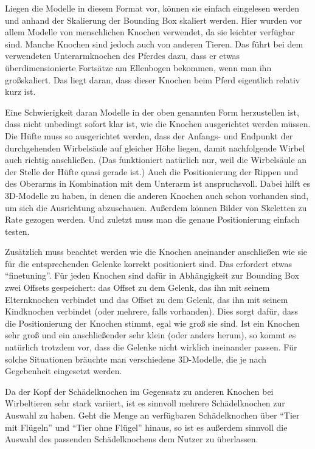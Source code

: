 Liegen die Modelle in diesem Format vor, können sie einfach eingelesen werden und anhand der Skalierung der Bounding Box skaliert werden.
Hier wurden vor allem Modelle von menschlichen Knochen verwendet, da sie leichter verfügbar sind. Manche Knochen sind jedoch auch von anderen Tieren. Das führt \zb bei dem verwendeten Unterarmknochen des Pferdes dazu, dass er etwas überdimensionierte Fortsätze am Ellenbogen bekommen, wenn man ihn großskaliert. Das liegt daran, dass dieser Knochen beim Pferd eigentlich relativ kurz ist.

Eine Schwierigkeit daran Modelle in der oben genannten Form herzustellen ist, dass nicht unbedingt sofort klar ist, wie die Knochen ausgerichtet werden müssen. Die Hüfte muss \zb so ausgerichtet werden, dass der Anfangs- und Endpunkt der durchgehenden Wirbelsäule auf gleicher Höhe liegen, damit nachfolgende Wirbel auch richtig anschließen. (Das funktioniert natürlich nur, weil die Wirbelsäule an der Stelle der Hüfte quasi gerade ist.) 
Auch die Positionierung der Rippen und des Oberarms in Kombination mit dem Unterarm ist anspruchsvoll. Dabei hilft es 3D-Modelle zu haben, in denen die anderen Knochen auch schon vorhanden sind, um sich die Ausrichtung abzuschauen. Außerdem können Bilder von Skeletten zu Rate gezogen werden. Und zuletzt muss man die genaue Positionierung einfach testen.

Zusätzlich muss beachtet werden wie die Knochen aneinander anschließen \bzw wie sie für die entsprechenden Gelenke korrekt positioniert sind. Das erfordert etwas "`finetuning"'. Für jeden Knochen sind dafür in Abhängigkeit zur Bounding Box zwei Offsets gespeichert: das Offset zu dem Gelenk, das ihn mit seinem Elternknochen verbindet und das Offset zu dem Gelenk, das ihn mit seinem Kindknochen verbindet (oder mehrere, falls vorhanden). Dies sorgt dafür, dass die Positionierung der Knochen stimmt, egal wie groß sie sind. Ist ein Knochen sehr groß und ein anschließender sehr klein (oder anders herum), so kommt es natürlich trotzdem vor, dass die Gelenke nicht wirklich ineinander passen. Für solche Situationen bräuchte man verschiedene 3D-Modelle, die je nach Gegebenheit eingesetzt werden.

Da der Kopf \bzw der Schädelknochen im Gegensatz zu anderen Knochen bei Wirbeltieren sehr stark variiert, ist es sinnvoll mehrere Schädelknochen zur Auswahl zu haben. Geht die Menge an verfügbaren Schädelknochen über "`Tier mit Flügeln"' und "`Tier ohne Flügel"' hinaus, so ist es außerdem sinnvoll die Auswahl des passenden Schädelknochens dem Nutzer zu überlassen.

